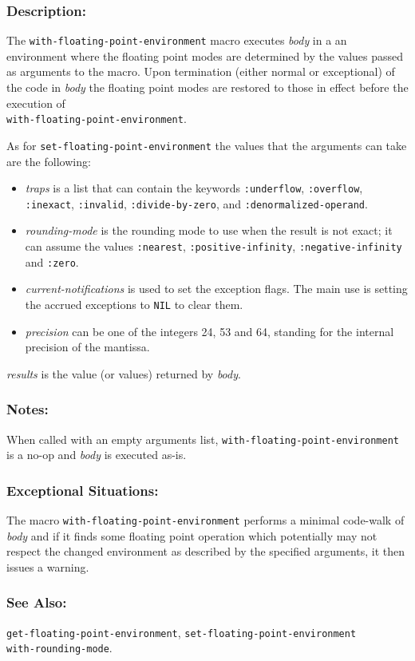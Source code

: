 \documentclass[10pt,fleqn]{article}
\newcommand{\code}[1]{\texttt{#1}}
\newcommand{\varname}[1]{\textit{#1}}
\newcommand{\DDescription}{\subsubsection*{Description:}}
\newcommand{\DExceptional}{\subsubsection*{Exceptional Situations:}}
\newcommand{\DNotes}{\subsubsection*{Notes:}}
\newcommand{\DSeeAlso}{\subsubsection*{See Also:}}
\begin{document}
\DDescription{}

The \code{with-floating-point-environment} macro executes \varname{body} in a
an environment where the floating point modes are determined by the
values passed as arguments to the macro.  Upon termination (either
normal or exceptional) of the code in \varname{body} the floating
point modes are restored to those in effect before the execution of\\
\code{with-floating-point-environment}.

As for \code{set-floating-point-environment} the values that the arguments
can take are the following:

\begin{itemize}
\item \varname{traps} is a list that can contain the keywords
  \code{:underflow}, \code{:overflow}, \code{:inexact}, \code{:invalid},
  \code{:divide-by-zero}, and \code{:denormalized-operand}.

\item \varname{rounding-mode} is the rounding mode to use when the result is
  not exact; it can assume the values \code{:nearest},
  \code{:positive-infinity}, \code{:negative-infinity} and
  \code{:zero}.

\item \varname{current-notifications} is used to set the exception flags. The
  main use is setting the accrued exceptions to \code{NIL} to clear
  them.

\item \varname{precision} can be one of the integers 24, 53 and 64,
  standing for the internal precision of the mantissa.
\end{itemize}



\noindent
\varname{results} is the value (or values) returned by \varname{body}.


\DNotes{}

When called with an empty arguments list,
\code{with-floating-point-environment} is a no-op and \varname{body}
is executed as-is.

\DExceptional{}

The macro \code{with-floating-point-environment} performs a minimal
code-walk of \varname{body} and if it finds some floating point
operation which potentially may not respect the changed environment as
described by the specified arguments, it then issues a warning.


\DSeeAlso{}

\code{get-floating-point-environment},
\code{set-floating-point-environment}\\
\code{with-rounding-mode}.
\end{document}
